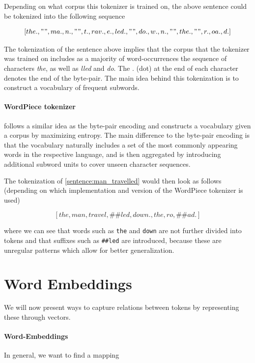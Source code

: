 \documentclass[a4paper,12pt,twoside,openright]{report}
\begin{document}
Depending on what corpus this tokenizer is trained on, the above sentence could be tokenized into the following sequence

$$
[the., " ", ma., n., " ", t., rav., e., led., " ", do., w., n., " ", the., " ", r., oa., d.]
$$

The tokenization of the sentence above implies that the corpus that the tokenizer was trained on includes as a majority of word-occurrences the sequence of characters \textit{the}, as well as \textit{lled} and \textit{do}. 
The $.$ (dot) at the end of each character denotes the end of the byte-pair.
The main idea behind this tokenization is to construct a vocabulary of frequent subwords.

\paragraph{WordPiece tokenizer} \label{tokenizer:WordPiece} \cite{wu16} follows a similar idea as the byte-pair encoding and constructs a vocabulary given a corpus by maximizing entropy.
The main difference to the byte-pair encoding is that the vocabulary naturally includes a set of the most commonly appearing words in the respective language, and is then aggregated by introducing additional subword units to cover unseen character sequences.

The tokenization of \ref{sentence:man_travelled} would then look as follows (depending on which implementation and version of the WordPiece tokenizer is used)

$$
[the, man, travel, \#\#led, down., the, ro,  \#\#ad.]
$$

where we can see that words such as \Verb#the# and \Verb#down# are not further divided into tokens and that suffixes such as \Verb!##led! are introduced, because these are unregular patterns which allow for better generalization.






\section{Word Embeddings}

We will now present ways to capture relations between tokens by representing these through vectors.

\paragraph{Word-Embeddings}
In general, we want to find a mapping 
\end{document}
